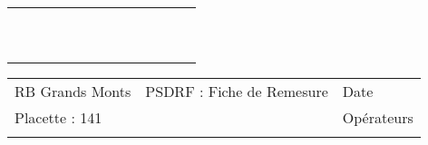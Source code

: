 \documentclass[a4paper, landscape]{article}\usepackage[]{graphicx}\usepackage[]{color}
\begin{document}
{\begin{tabular}{|p{1cm}|p{2cm}|p{1.6cm}|p{1.6cm}|p{1.6cm}|p{1.6cm}|p{1.5cm}|p{1.5cm}|p{1.5cm}|p{1.5cm}|p{1.5cm}|p{7.5cm}|p{5cm}|}
 &  &  &  &  &  &  &  &  &  &  &  &  \\ 
   \hline
 &  &  &  &  &  &  &  &  &  &  &  &  \\ 
   \rowcolor[gray]{0.95} \hline
 &  &  &  &  &  &  &  &  &  &  &  &  \\ 
   \hline
 &  &  &  &  &  &  &  &  &  &  &  &  \\ 
   \rowcolor[gray]{0.95} \hline
 &  &  &  &  &  &  &  &  &  &  &  &  \\ 
   \hline
 &  &  &  &  &  &  &  &  &  &  &  &  \\ 
   \rowcolor[gray]{0.95} \hline
 &  &  &  &  &  &  &  &  &  &  &  &  \\ 
   \hline
 &  &  &  &  &  &  &  &  &  &  &  &  \\ 
   \rowcolor[gray]{0.95} \hline
 &  &  &  &  &  &  &  &  &  &  &  &  \\ 
   \hline
 &  &  &  &  &  &  &  &  &  &  &  &  \\ 
   \rowcolor[gray]{0.95} \hline
 &  &  &  &  &  &  &  &  &  &  &  &  \\ 
   \hline
\end{tabular}
}

\begin{tabular}{p{10cm}p{10cm}p{8cm}}
  RB Grands Monts & PSDRF : Fiche de Remesure & Date \\ 
  Placette : 141 &  & Opérateurs \\ 
   &  &  \\ 
  \end{tabular}
\end{document}
